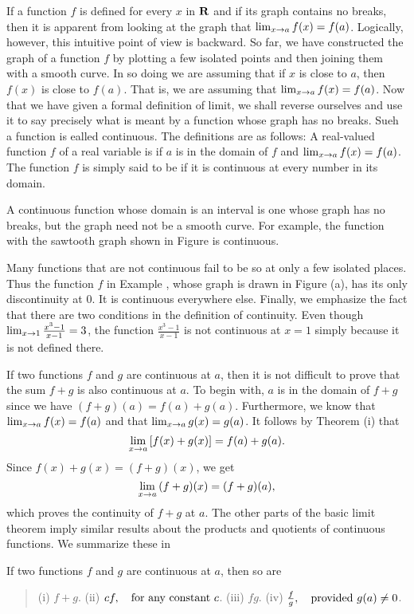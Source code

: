 If a function $f$ is defined for every $x$ in $\mathrm{\bf R}$
and if its graph contains no breaks,
then it is apparent from looking at the graph that
$\lim_{x \rightarrow a}f(x) = f(a)$.
Logically, however, this intuitive point of view is backward.
So far, we have constructed the graph of a function $f$
by plotting a few isolated points
and then joining them with a smooth curve.
In so doing we are assuming that if
$x$ is close to $a$,
then $f(x)$ is close to $f(a)$.
That is, we are assuming that
$\lim_{x \rightarrow a} {f(x)} = f(a)$.
Now that we have given a formal definition of limit,
we shall reverse ourselves
and use it to say precisely what is meant by
a function whose graph has no breaks.
Sueh a function is ealled continuous.
The definitions are as follows:
A real-valued function $f$ of a real variable is
if $a$ is in the domain of $f$
and $\lim_{x \rightarrow a}f(x) = f(a)$.
The function $f$  is simply said to be 
if it is continuous at every number in its domain.

A continuous function whose domain is an interval
is one whose graph has no breaks,
but the graph need not be a smooth curve.
For example, the function with the sawtooth graph
shown in Figure  is continuous.

Many functions that are not continuous
fail to be so at only a few isolated places.
Thus the function $f$ in Example ,
whose graph is drawn in Figure (a),
has its only discontinuity at 0.
It is continuous everywhere else.
Finally, we emphasize the fact that
there are two conditions in the definition of continuity.
Even though
$\lim_{x \rightarrow 1} {\frac{x^{3} - 1}{x - 1}} = 3$,
the function
$\frac{x^{3} - 1}{x - 1}$
is not continuous at $x = 1$
simply because it is not defined there.

If two functions $f$ and $g$ are continuous at $a$,
then it is not difficult to prove that
the sum $f + g$ is also continuous at $a$.
To begin with,
$a$ is in the domain of $f + g$
since we have $(f + g)(a) = f(a) + g(a)$.
Furthermore, we know that
$\lim_{x \rightarrow a}f(x) = f(a)$
and that
$\lim_{x \rightarrow a} g(x) = g(a)$.
It follows by Theorem (i)
that 
\[
\lim_{x \rightarrow a} {[f(x) + g(x)]} = f(a) + g(a).
\]
Since $f(x) + g(x) = (f + g)(x)$, we get
\[
\lim_{x \rightarrow a} {(f + g)(x)} = (f + g)(a),  
\]
which proves the continuity of $f + g$ at $a$.
The other parts of the basic limit theorem 
imply similar results about the products and quotients
of continuous functions.
We summarize these in
\begin{prop}\label{thm 1.4.2}\label{thm bct}
If two functions  $f$  and  $g$  are continuous at  $a$, then so are
\begin{quote}
(i)   $f + g$.
(ii)  $c f, \quad \mbox{for any constant $c$}$.
(iii)  $f g$.
(iv)  $\frac{f}{g}, \quad \mbox{provided $g(a) \neq 0$}$.
\end{quote}
\end{prop}

